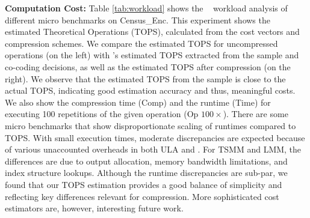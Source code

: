 \textbf{Computation Cost:} Table \ref{tab:workload} shows the \name~ workload analysis of different micro benchmarks on Census\_Enc.
This experiment shows the estimated Theoretical Operations (TOPS), calculated from the cost vectors and compression schemes.
We compare the estimated TOPS for uncompressed operations (on the left) with \name's estimated TOPS extracted from the sample and co-coding decisions, as well as the estimated TOPS after compression (on the right). We observe that the estimated TOPS from the sample is close to the actual TOPS, indicating good estimation accuracy and thus, meaningful costs. We also show the compression time (Comp) and the runtime (Time) for executing 100 repetitions of the given operation (Op $100\times$). There are some micro benchmarks that show disproportionate scaling of runtimes compared to TOPS. With small execution times, moderate discrepancies are expected because of various unaccounted overheads in both ULA and \name. For TSMM and LMM, the differences are due to output allocation, memory bandwidth limitations, and index structure lookups. Although the runtime discrepancies are sub-par, we found that our TOPS estimation provides a good balance of simplicity and reflecting key differences relevant for compression. More sophisticated cost estimators are, however, interesting future work.


